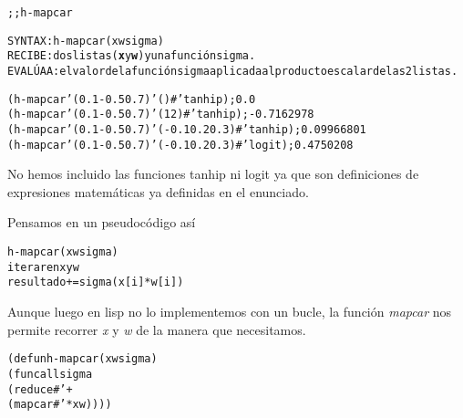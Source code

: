 \begin{aibox}{\function}
\begin{alltt}
;; h-mapcar

SYNTAX: h-mapcar (x w sigma) 
RECIBE: dos listas (\textbf{x} y \textbf{w}) y una función sigma.
EVALÚA A: el valor de la función sigma aplicada al producto escalar de las 2 listas.
\end{alltt}
\end{aibox}

\begin{aibox}{\examples}
\begin{alltt}
(h-mapcar '(0.1 -0.5 0.7) '() #'tanhip); 0.0
(h-mapcar '(0.1 -0.5 0.7) '(1 2) #'tanhip); -0.7162978
(h-mapcar '(0.1 -0.5 0.7) '(-0.1 0.2 0.3) #'tanhip); 0.09966801
(h-mapcar '(0.1 -0.5 0.7) '(-0.1 0.2 0.3) #'logit); 0.4750208
\end{alltt}
\end{aibox}

\begin{aibox}{\comments}
No hemos incluido las funciones tanhip ni logit ya que son definiciones de expresiones matemáticas ya definidas en el enunciado.
\end{aibox}
\begin{aibox}{\pseudocode}
Pensamos en un pseudocódigo así
\begin{alltt}
h-mapcar (x w sigma)
    iterar en x y w
        resultado += sigma(x[i]*w[i])
   
\end{alltt}

Aunque luego en lisp no lo implementemos con un bucle, la función \emph{mapcar} nos permite recorrer \emph{x} y \emph{w} de la manera que necesitamos.
\end{aibox}
\begin{aibox}{\code}

\begin{alltt}
(defun h-mapcar (x w sigma) 
    (funcall sigma 
        (reduce #'+
            (mapcar #'* x w))))
\end{alltt}
\end{aibox}
